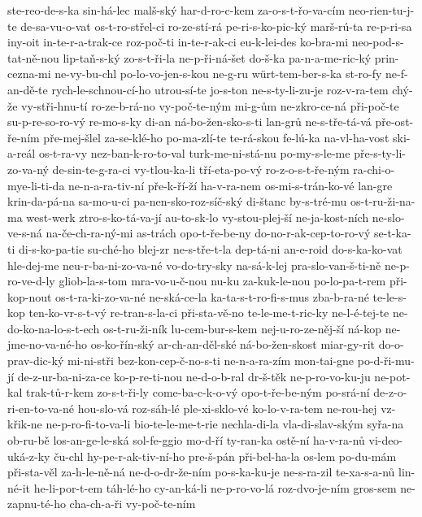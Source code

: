 ste-reo-de-s-ka
sin-há-lec
malš-ský
har-d-ro-c-kem
za-o-s-t-řo-va-cím
neo-rien-tu-j-te
de-sa-vu-o-vat
os-t-ro-střel-ci
ro-ze-stí-rá
pe-ri-s-ko-pic-ký
marš-rú-ta
re-p-ri-sa
iny-oit
in-te-r-a-trak-ce
roz-poč-ti
in-te-r-ak-ci
eu-k-lei-des
ko-bra-mi
neo-pod-s-tat-ně-nou
lip-taň-s-ký
zo-s-t-ři-la
ne-p-ři-ná-šet
do-š-ka
pa-n-a-me-ric-ký
prin-cezna-mi
ne-vy-bu-chl
po-lo-vo-jen-s-kou
ne-g-ru
würt-tem-ber-s-ka
st-ro-fy
ne-f-an-dě-te
rych-le-schnou-cí-ho
utrou-sí-te
jo-s-ton
ne-s-ty-li-zu-je
roz-v-ra-tem
chý-že
vy-stři-hnu-tí
ro-ze-b-rá-no
vy-poč-te-ným
mi-g-ům
ne-zkro-ce-ná
při-poč-te
su-p-re-so-ro-vý
re-mo-s-ky
di-an
ná-bo-žen-sko-s-ti
lan-grů
ne-s-tře-tá-vá
pře-ost-ře-ním
pře-mej-šlel
za-se-klé-ho
po-ma-zlí-te
te-rá-skou
fe-lú-ka
na-vl-ha-vost
ski-a-reál
os-t-ra-vy
nez-ban-k-ro-to-val
turk-me-ni-stá-nu
po-my-s-le-me
pře-s-ty-li-zo-va-ný
de-sin-te-g-ra-ci
vy-tlou-ka-li
tří-eta-po-vý
ro-z-o-s-t-ře-ným
ra-chi-o-mye-li-ti-da
ne-n-a-ra-tiv-ní
pře-k-ří-ží
ha-v-ra-nem
os-mi-s-trán-ko-vé
lan-gre
krin-da-pá-na
sa-mo-u-ci
pa-nen-sko-roz-síč-ský
di-štanc
by-s-tré-mu
os-t-ru-ži-na-ma
west-werk
ztro-s-ko-tá-va-jí
au-to-sk-lo
vy-stou-plej-ší
ne-ja-kost-ních
ne-slo-ve-s-ná
na-če-ch-ra-ný-mi
as-trách
opo-t-ře-be-ny
do-no-r-ak-cep-to-ro-vý
se-t-ka-ti
di-s-ko-pa-tie
su-ché-ho
blej-zr
ne-s-tře-t-la
dep-tá-ni
an-e-roid
do-s-ka-ko-vat
hle-dej-me
neu-r-ba-ni-zo-va-né
vo-do-try-sky
na-sá-k-lej
pra-slo-van-š-ti-ně
ne-p-ro-ve-d-ly
gliob-la-s-tom
mra-vo-u-č-nou
nu-ku
za-kuk-le-nou
po-lo-pa-t-rem
při-kop-nout
os-t-ra-ki-zo-va-né
ne-ská-ce-la
ka-ta-s-t-ro-fi-s-mus
zba-b-ra-né
te-le-s-kop
ten-ko-vr-s-t-vý
re-tran-s-la-ci
při-sta-vě-no
te-le-me-t-ric-ky
ne-l-é-tej-te
ne-do-ko-na-lo-s-t-ech
os-t-ru-ži-ník
lu-cem-bur-s-kem
nej-u-ro-ze-něj-ší
ná-kop
ne-jme-no-va-né-ho
os-ko-řín-ský
ar-ch-an-děl-ské
ná-bo-žen-skost
miar-gy-rit
do-o-prav-dic-ký
mi-ni-stři
bez-kon-cep-č-no-s-ti
ne-n-a-ra-zím
mon-tai-gne
po-d-ři-mu-jí
de-z-ur-ba-ni-za-ce
ko-p-re-ti-nou
ne-d-o-b-ral
dr-š-těk
ne-p-ro-vo-ku-ju
ne-pot-kal
trak-tů-r-kem
zo-s-t-ři-ly
come-ba-c-k-o-vý
opo-t-ře-be-ným
po-srá-ní
de-z-o-ri-en-to-va-né
hou-slo-vá
roz-sáh-lé
ple-xi-sklo-vé
ko-lo-v-ra-tem
ne-rou-hej
vz-křik-ne
ne-p-ro-fi-to-va-li
bio-te-le-me-t-rie
nechla-di-la
vla-di-slav-ským
syřa-na
ob-ru-bě
los-an-ge-le-ská
sol-fe-ggio
mo-d-ří
ty-ran-ka
ostě-ní
ha-v-ra-nů
vi-deo-uká-z-ky
ču-chl
hy-pe-r-ak-tiv-ní-ho
pre-š-pán
při-bel-ha-la
os-lem
po-du-mám
při-sta-věl
za-h-le-ně-ná
ne-d-o-dr-že-ním
po-s-ka-ku-je
ne-s-ra-zil
te-xa-s-a-nů
lin-né-it
he-li-por-t-em
táh-lé-ho
cy-an-ká-li
ne-p-ro-vo-lá
roz-dvo-je-ním
gros-sem
ne-zapnu-té-ho
cha-ch-a-ři
vy-poč-te-ním
